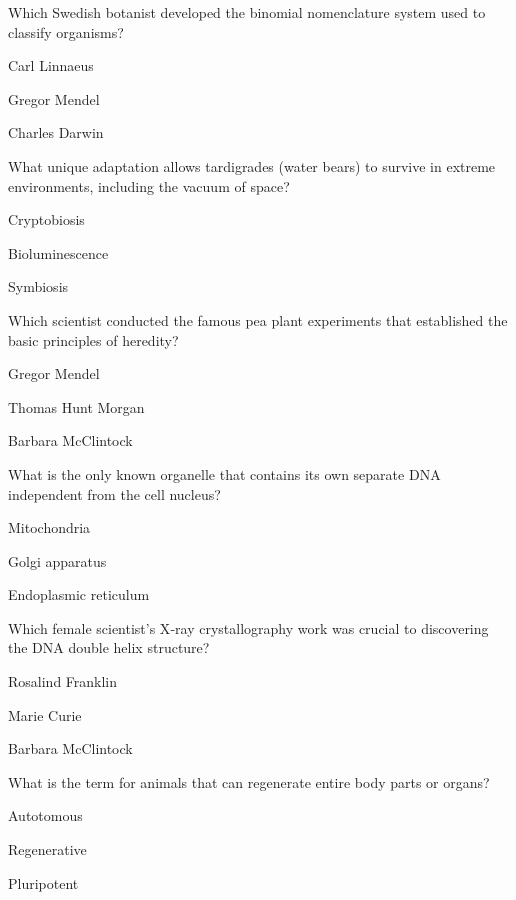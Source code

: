 
\begin{enhancedmcq}{Which Swedish botanist developed the binomial nomenclature system used to classify organisms?}
\item Carl Linnaeus
\item Gregor Mendel
\item Charles Darwin

\end{enhancedmcq}
\begin{enhancedmcq}{What unique adaptation allows tardigrades (water bears) to survive in extreme environments, including the vacuum of space?}
\item Cryptobiosis
\item Bioluminescence
\item Symbiosis

\end{enhancedmcq}
\begin{enhancedmcq}{Which scientist conducted the famous pea plant experiments that established the basic principles of heredity?}
\item Gregor Mendel
\item Thomas Hunt Morgan
\item Barbara McClintock

\end{enhancedmcq}
\begin{enhancedmcq}{What is the only known organelle that contains its own separate DNA independent from the cell nucleus?}
\item Mitochondria
\item Golgi apparatus
\item Endoplasmic reticulum

\end{enhancedmcq}
\begin{enhancedmcq}{Which female scientist's X‑ray crystallography work was crucial to discovering the DNA double helix structure?}
\item Rosalind Franklin
\item Marie Curie
\item Barbara McClintock

\end{enhancedmcq}
\begin{enhancedmcq}{What is the term for animals that can regenerate entire body parts or organs?}
\item Autotomous
\item Regenerative
\item Pluripotent

\end{enhancedmcq}
